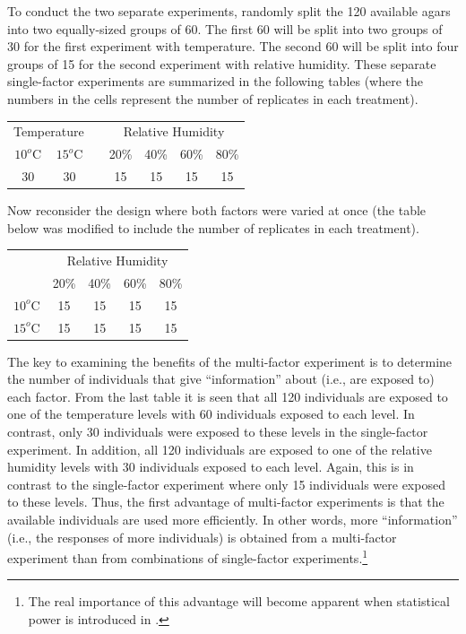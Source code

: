 \documentclass[10pt,openany]{book}\usepackage[]{graphicx}\usepackage[]{color}
\begin{document}
To conduct the two separate experiments, randomly split the 120 available agars into two equally-sized groups of 60.  The first 60 will be split into two groups of 30 for the first experiment with temperature.  The second 60 will be split into four groups of 15 for the second experiment with relative humidity. These separate single-factor experiments are summarized in the following tables (where the numbers in the cells represent the number of replicates in each treatment).

\begin{center}
\begin{tabular}{|c|c|c|c|c|c|c|}
\multicolumn{2}{c}{Temperature} & \multicolumn{1}{c}{} & \multicolumn{4}{c}{Relative Humidity} \\
\cline{1-2}\cline{4-7}
$10^{o}$C & $15^{o}$C & & 20\% & 40\% & 60\% & 80\% \\
\cline{1-2}\cline{4-7}
30 & 30 & & 15 & 15 & 15 & 15 \\
\cline{1-2}\cline{4-7}
\end{tabular}
\end{center}

Now reconsider the design where both factors were varied at once (the table below was modified to include the number of replicates in each treatment).

\begin{center}
\begin{tabular}{cc|c|c|c}
 & \multicolumn{4}{c}{Relative Humidity} \\
\cline{2-5}
 & 20\% & 40\% & 60\% & 80\% \\
\cline{2-5}
\multicolumn{1}{c|}{$10^{o}$C} & 15 & 15 & 15 & \multicolumn{1}{c|}{15} \\
\hline
\multicolumn{1}{c|}{$15^{o}$C} & 15 & 15 & 15 & \multicolumn{1}{c|}{15} \\
\cline{2-5}
\end{tabular}
\end{center}

The key to examining the benefits of the multi-factor experiment is to determine the number of individuals that give ``information'' about (i.e., are exposed to) each factor.  From the last table it is seen that all 120 individuals are exposed to one of the temperature levels with 60 individuals exposed to each level.  In contrast, only 30 individuals were exposed to these levels in the single-factor experiment.  In addition, all 120 individuals are exposed to one of the relative humidity levels with 30 individuals exposed to each level.  Again, this is in contrast to the single-factor experiment where only 15 individuals were exposed to these levels.  Thus, the first advantage of multi-factor experiments is that the available individuals are used more efficiently.  In other words, more ``information'' (i.e., the responses of more individuals) is obtained from a multi-factor experiment than from combinations of single-factor experiments.\footnote{The real importance of this advantage will become apparent when statistical power is introduced in .}
\end{document}
